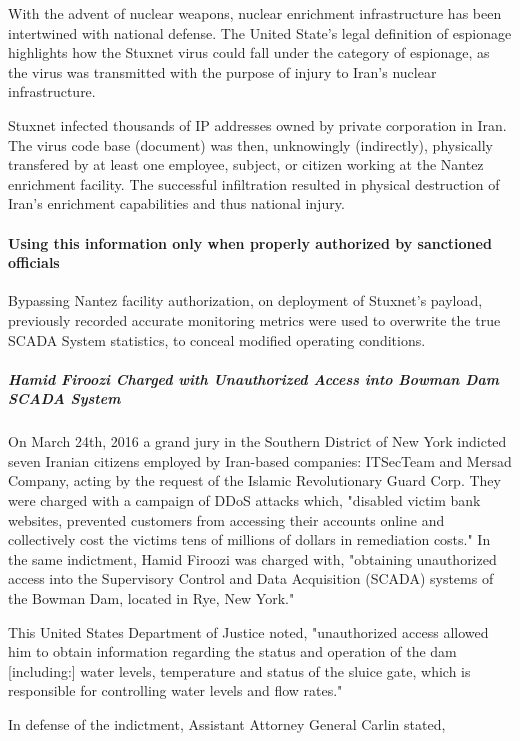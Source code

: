 \documentclass[12pt]{article}
\begin{document}
\begin{multicols}{2}
With the advent of nuclear weapons, nuclear enrichment infrastructure has been intertwined with national defense. The United State's legal definition of espionage highlights how the Stuxnet virus could fall under the category of espionage, as the virus was transmitted with the purpose of injury to Iran's nuclear infrastructure.

Stuxnet infected thousands of IP addresses owned by private corporation in Iran. The virus code base (document) was then, unknowingly (indirectly), physically transfered by at least one employee, subject, or citizen working at the Nantez enrichment facility. The successful infiltration resulted in physical destruction of Iran's enrichment capabilities and thus national injury.

\paragraph{Using this information only when properly authorized by sanctioned officials}

Bypassing Nantez facility authorization, on deployment of Stuxnet's payload, previously recorded accurate monitoring metrics were used to overwrite the true SCADA System statistics, to conceal modified operating conditions.

\subparagraph{Hamid Firoozi Charged with Unauthorized Access into Bowman Dam SCADA System}

On March 24th, 2016 a grand jury in the Southern District of New York indicted seven Iranian citizens employed by Iran-based companies: ITSecTeam and Mersad Company, acting by the request of the Islamic Revolutionary Guard Corp. They were charged with a campaign of DDoS attacks which, "disabled victim bank websites, prevented customers from accessing their accounts online and collectively cost the victims tens of millions of dollars in remediation costs."\cite{sevenIraniansIndicted} In the same indictment, Hamid Firoozi was charged with, "obtaining unauthorized access into the Supervisory Control and Data Acquisition (SCADA) systems of the Bowman Dam, located in Rye, New York."\cite{sevenIraniansIndicted}

This United States Department of Justice noted, "unauthorized access allowed him to obtain information regarding the status and operation of the dam [including:] water levels, temperature and status of the sluice gate, which is responsible for controlling water levels and flow rates."\cite{sevenIraniansIndicted}

In defense of the indictment, Assistant Attorney General Carlin stated,


\end{multicols}
\end{document}
